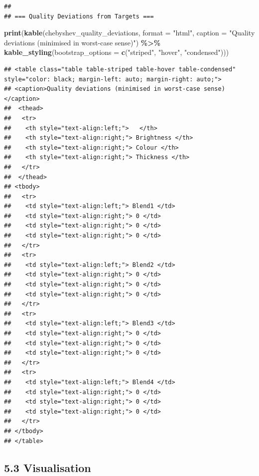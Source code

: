 \documentclass[
]{article}
\newenvironment{Shaded}{\begin{snugshade}}{\end{snugshade}}
\newcommand{\AttributeTok}[1]{\textcolor[rgb]{0.13,0.29,0.53}{#1}}
\newcommand{\FunctionTok}[1]{\textcolor[rgb]{0.13,0.29,0.53}{\textbf{#1}}}
\newcommand{\NormalTok}[1]{#1}
\newcommand{\SpecialCharTok}[1]{\textcolor[rgb]{0.81,0.36,0.00}{\textbf{#1}}}
\newcommand{\StringTok}[1]{\textcolor[rgb]{0.31,0.60,0.02}{#1}}
\begin{document}
\begin{verbatim}
## 
## === Quality Deviations from Targets ===
\end{verbatim}

\begin{Shaded}
\begin{Highlighting}[]
\FunctionTok{print}\NormalTok{(}\FunctionTok{kable}\NormalTok{(chebyshev\_quality\_deviations, }\AttributeTok{format =} \StringTok{"html"}\NormalTok{, }
            \AttributeTok{caption =} \StringTok{"Quality deviations (minimised in worst{-}case sense)"}\NormalTok{) }\SpecialCharTok{\%\textgreater{}\%}
      \FunctionTok{kable\_styling}\NormalTok{(}\AttributeTok{bootstrap\_options =} \FunctionTok{c}\NormalTok{(}\StringTok{"striped"}\NormalTok{, }\StringTok{"hover"}\NormalTok{, }\StringTok{"condensed"}\NormalTok{)))}
\end{Highlighting}
\end{Shaded}

\begin{verbatim}
## <table class="table table-striped table-hover table-condensed" style="color: black; margin-left: auto; margin-right: auto;">
## <caption>Quality deviations (minimised in worst-case sense)</caption>
##  <thead>
##   <tr>
##    <th style="text-align:left;">   </th>
##    <th style="text-align:right;"> Brightness </th>
##    <th style="text-align:right;"> Colour </th>
##    <th style="text-align:right;"> Thickness </th>
##   </tr>
##  </thead>
## <tbody>
##   <tr>
##    <td style="text-align:left;"> Blend1 </td>
##    <td style="text-align:right;"> 0 </td>
##    <td style="text-align:right;"> 0 </td>
##    <td style="text-align:right;"> 0 </td>
##   </tr>
##   <tr>
##    <td style="text-align:left;"> Blend2 </td>
##    <td style="text-align:right;"> 0 </td>
##    <td style="text-align:right;"> 0 </td>
##    <td style="text-align:right;"> 0 </td>
##   </tr>
##   <tr>
##    <td style="text-align:left;"> Blend3 </td>
##    <td style="text-align:right;"> 0 </td>
##    <td style="text-align:right;"> 0 </td>
##    <td style="text-align:right;"> 0 </td>
##   </tr>
##   <tr>
##    <td style="text-align:left;"> Blend4 </td>
##    <td style="text-align:right;"> 0 </td>
##    <td style="text-align:right;"> 0 </td>
##    <td style="text-align:right;"> 0 </td>
##   </tr>
## </tbody>
## </table>
\end{verbatim}

\subsection{5.3 Visualisation}\label{visualisation-2}
\end{document}
